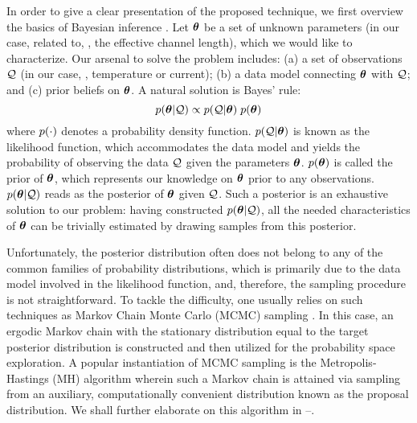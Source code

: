 In order to give a clear presentation of the proposed technique, we first overview the basics of Bayesian inference \cite{gelman2004}.
Let ${\boldsymbol\theta}$ be a set of unknown parameters (in our case, related to, \eg, the effective channel length), which we would like to characterize.
Our arsenal to solve the problem includes: (a) a set of observations $\mathcal{Q}$ (in our case, \eg, temperature or current); (b) a data model connecting ${\boldsymbol\theta}$ with $\mathcal{Q}$; and (c) prior beliefs on ${\boldsymbol\theta}$.
A natural solution is Bayes' rule:
\begin{equation} \elabel{bayes}
  \f{\vparam | \QData} \propto \f{\QData | \vparam} \; \f{\vparam}
\end{equation}
where $\f{\cdot}$ denotes a probability density function.
$\f{\QData | \vparam}$ is known as the likelihood function, which accommodates the data model and yields the probability of observing the data $\mathcal{Q}$ given the parameters ${\boldsymbol\theta}$.
$\f{\vparam}$ is called the prior of ${\boldsymbol\theta}$, which represents our knowledge on ${\boldsymbol\theta}$ prior to any observations.
$\f{\vparam | \QData}$ reads as the posterior of ${\boldsymbol\theta}$ given $\mathcal{Q}$.
Such a posterior is an exhaustive solution to our problem: having constructed $\f{\vparam | \QData}$, all the needed characteristics of ${\boldsymbol\theta}$ can be trivially estimated by drawing samples from this posterior.

Unfortunately, the posterior distribution often does not belong to any of the common families of probability distributions, which is primarily due to the data model involved in the likelihood function, and, therefore, the sampling procedure is not straightforward.
To tackle the difficulty, one usually relies on such techniques as Markov Chain Monte Carlo (MCMC) sampling \cite{gelman2004}. In this case, an ergodic Markov chain with the stationary distribution equal to the target posterior distribution is constructed and then utilized for the probability space exploration.
A popular instantiation of MCMC sampling is the Metropolis-Hastings (MH) algorithm wherein such a Markov chain is attained via sampling from an auxiliary, computationally convenient distribution known as the proposal distribution. We shall further elaborate on this algorithm in --.
